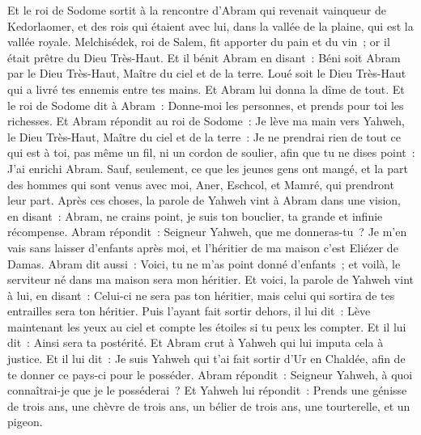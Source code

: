 \begin{multicols}{2}
Et le roi de Sodome sortit à la rencontre d'Abram qui revenait vainqueur de Kedorlaomer, et des rois qui étaient avec lui, dans la vallée de la plaine, qui est la vallée royale.
Melchisédek, roi de Salem, fit apporter du pain et du vin~; or il était prêtre du Dieu Très-Haut.
Et il bénit Abram en disant~: Béni soit Abram par le Dieu Très-Haut, Maître du ciel et de la terre.
Loué soit le Dieu Très-Haut qui a livré tes ennemis entre tes mains. Et Abram lui donna la dîme de tout.
Et le roi de Sodome dit à Abram~: Donne-moi les personnes, et prends pour toi les richesses.
Et Abram répondit au roi de Sodome~: Je lève ma main vers Yahweh, le Dieu Très-Haut, Maître du ciel et de la terre~:
Je ne prendrai rien de tout ce qui est à toi, pas même un fil, ni un cordon de soulier, afin que tu ne dises point~: J'ai enrichi Abram.
Sauf, seulement, ce que les jeunes gens ont mangé, et la part des hommes qui sont venus avec moi, Aner, Eschcol, et Mamré, qui prendront leur part.
\VerseOne{}Après ces choses, la parole de Yahweh vint à Abram dans une vision, en disant~: Abram, ne crains point, je suis ton bouclier, ta grande et infinie récompense.
Abram répondit~: Seigneur Yahweh, que me donneras-tu~? Je m'en vais sans laisser d'enfants après moi, et l'héritier de ma maison c'est Eliézer de Damas.
Abram dit aussi~: Voici, tu ne m'as point donné d'enfants~; et voilà, le serviteur né dans ma maison sera mon héritier.
Et voici, la parole de Yahweh vint à lui, en disant~: Celui-ci ne sera pas ton héritier, mais celui qui sortira de tes entrailles sera ton héritier.
Puis l'ayant fait sortir dehors, il lui dit~: Lève maintenant les yeux au ciel et compte les étoiles si tu peux les compter. Et il lui dit~: Ainsi sera ta postérité.
Et Abram crut à Yahweh qui lui imputa cela à justice.
Et il lui dit~: Je suis Yahweh qui t'ai fait sortir d'Ur en Chaldée, afin de te donner ce pays-ci pour le posséder.
Abram répondit~: Seigneur Yahweh, à quoi connaîtrai-je que je le posséderai~?
Et Yahweh lui répondit~: Prends une génisse de trois ans, une chèvre de trois ans, un bélier de trois ans, une tourterelle, et un pigeon.

\end{multicols}
